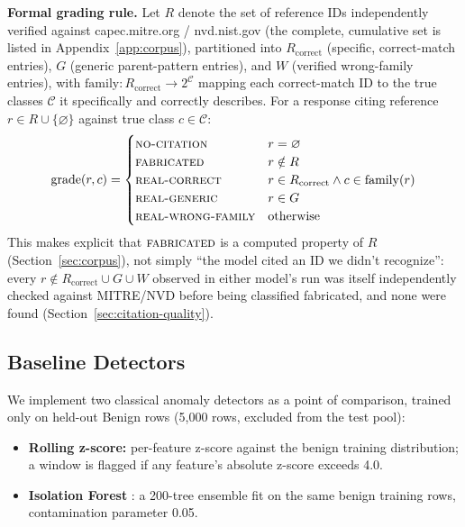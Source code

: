 \documentclass[10pt,twocolumn]{article}
\begin{document}
\medskip
\noindent\textbf{Formal grading rule.} Let $R$ denote the set of reference IDs independently verified against capec.mitre.org / nvd.nist.gov (the complete, cumulative set is listed in Appendix~\ref{app:corpus}), partitioned into $R_{\mathrm{correct}}$ (specific, correct-match entries), $G$ (generic parent-pattern entries), and $W$ (verified wrong-family entries), with $\mathrm{family} : R_{\mathrm{correct}} \to 2^{\mathcal{C}}$ mapping each correct-match ID to the true classes $\mathcal{C}$ it specifically and correctly describes. For a response citing reference $r \in R \cup \{\varnothing\}$ against true class $c \in \mathcal{C}$:
$$
\mathrm{grade}(r, c) =
\begin{cases}
\textsc{no-citation} & r = \varnothing \\
\textsc{fabricated} & r \notin R \\
\textsc{real-correct} & r \in R_{\mathrm{correct}} \wedge c \in \mathrm{family}(r) \\
\textsc{real-generic} & r \in G \\
\textsc{real-wrong-family} & \text{otherwise}
\end{cases}
$$
This makes explicit that $\textsc{fabricated}$ is a computed property of $R$ (Section~\ref{sec:corpus}), not simply ``the model cited an ID we didn't recognize'': every $r \notin R_{\mathrm{correct}} \cup G \cup W$ observed in either model's run was itself independently checked against MITRE/NVD before being classified fabricated, and none were found (Section~\ref{sec:citation-quality}).

\subsection{Baseline Detectors}
\label{sec:baselines}

We implement two classical anomaly detectors as a point of comparison, trained only on held-out Benign rows (5{,}000 rows, excluded from the test pool):

\begin{itemize}[nosep]
\item \textbf{Rolling z-score:} per-feature z-score against the benign training distribution; a window is flagged if any feature's absolute z-score exceeds 4.0.
\item \textbf{Isolation Forest} \cite{liu2008isolationforest}: a 200-tree ensemble fit on the same benign training rows, contamination parameter 0.05.
\end{itemize}
\end{document}
